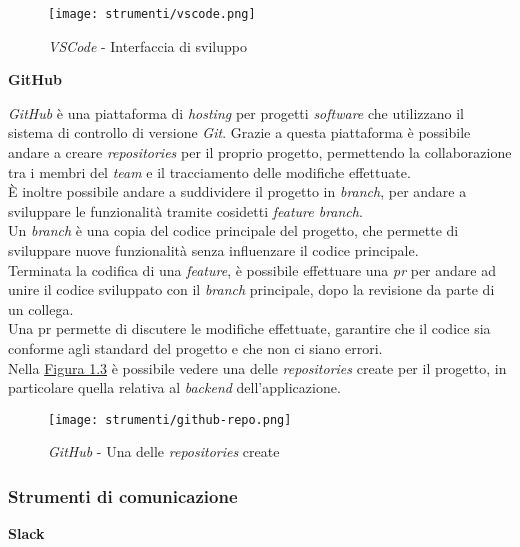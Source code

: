 \begin{figure}[H]
    \label{fig:vscode}
    \centering
    \texttt{[image: strumenti/vscode.png]}
    \caption{\textit{VSCode} - Interfaccia di sviluppo}
\end{figure}

\noindent \textbf{GitHub\\}

\noindent \textit{GitHub} è una piattaforma di \textit{hosting} per progetti \textit{software} che utilizzano il sistema di controllo di versione \textit{Git}.
Grazie a questa piattaforma è possibile andare a creare \textit{repositories} per il proprio progetto, permettendo la collaborazione tra i membri del \textit{team} e il tracciamento delle modifiche effettuate. \\
È inoltre possibile andare a suddividere il progetto in \textit{\gls{branch}}, per andare a sviluppare le funzionalità tramite cosidetti \textit{feature branch}.\\
Un \textit{\gls{branch}} è una copia del codice principale del progetto, che permette di sviluppare nuove funzionalità senza influenzare il codice principale.\\
Terminata la codifica di una \textit{feature}, è possibile effettuare una \textit{\gls{pr}} per andare ad unire il codice sviluppato con il \textit{\gls{branch}} principale, dopo la revisione da parte di un collega.\\
Una \gls{pr} permette di discutere le modifiche effettuate, garantire che il codice sia conforme agli standard del progetto e che non ci siano errori.\\
Nella {\hyperref[fig:github]{Figura 1.3}} è possibile vedere una delle \textit{repositories} create per il progetto, in particolare quella relativa al \textit{\gls{backend}} dell'applicazione.

\begin{figure}[H]
    \label{fig:github} 
    \centering
    \texttt{[image: strumenti/github-repo.png]}
    \caption{\textit{GitHub} - Una delle \textit{repositories} create}
\end{figure}

\pagebreak
\subsubsection{Strumenti di comunicazione}
\label{sez:strumenti-comunicazione}


\noindent \textbf{Slack\\}


